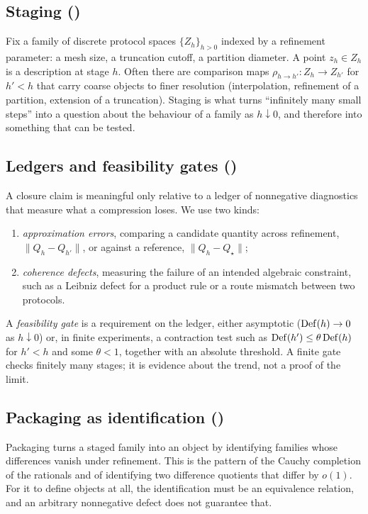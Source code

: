 \subsection{Staging (\Pfour)}
Fix a family of discrete protocol spaces $\{Z_h\}_{h>0}$ indexed by a refinement parameter: a mesh size, a truncation cutoff, a partition diameter.
A point $z_h\in Z_h$ is a description at stage $h$.
Often there are comparison maps $\rho_{h\to h'}:Z_h\to Z_{h'}$ for $h'<h$ that carry coarse objects to finer resolution (interpolation, refinement of a partition, extension of a truncation).
Staging is what turns ``infinitely many small steps'' into a question about the behaviour of a family as $h\downarrow 0$, and therefore into something that can be tested.

\subsection{Ledgers and feasibility gates (\Psix)}
A closure claim is meaningful only relative to a ledger of nonnegative diagnostics that measure what a compression loses.
We use two kinds:
\begin{enumerate}
  \item \emph{approximation errors}, comparing a candidate quantity across refinement, $\|Q_h-Q_{h'}\|$, or against a reference, $\|Q_h-Q_\star\|$;
  \item \emph{coherence defects}, measuring the failure of an intended algebraic constraint, such as a Leibniz defect for a product rule or a route mismatch between two protocols.
\end{enumerate}
A \emph{feasibility gate} is a requirement on the ledger, either asymptotic ($\mathrm{Def}(h)\to 0$ as $h\downarrow 0$) or, in finite experiments, a contraction test such as $\mathrm{Def}(h')\le\theta\,\mathrm{Def}(h)$ for $h'<h$ and some $\theta<1$, together with an absolute threshold.
A finite gate checks finitely many stages; it is evidence about the trend, not a proof of the limit.

\subsection{Packaging as identification (\Pfive)}
\label{subsec:packaging}
Packaging turns a staged family into an object by identifying families whose differences vanish under refinement.
This is the pattern of the Cauchy completion of the rationals and of identifying two difference quotients that differ by $o(1)$.
For it to define objects at all, the identification must be an equivalence relation, and an arbitrary nonnegative defect does not guarantee that.

